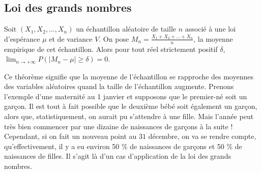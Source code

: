 	\subsection{Loi des grands nombres}

	\begin{formula}
		Soit $(X_1, X_2, \dots, X_n)$ un échantillon aléatoire de taille $n$ associé à une loi d'espérance $\mu$ et de variance $V$. On pose $M_n = \frac{X_1 + X_2 + \dots + X_n}{n}$, la moyenne empirique de cet échantillon.
		\newpar
		Alors pour tout réel strictement positif $\delta$, $\lim_{n \rightarrow +\infty} P(|M_n - \mu| \geq \delta) = 0$.
	\end{formula}

	\begin{tip}
		Ce théorème signifie que la moyenne de l'échantillon se rapproche des moyennes des variables aléatoires quand la taille de l'échantillon augmente.
		\newpar
		Prenons l'exemple d'une maternité au 1\ier{} janvier et supposons que le premier-né soit un garçon. Il est tout à fait possible que le deuxième bébé soit également un garçon, alors que, statistiquement, on aurait pu s'attendre à une fille.
		\newpar
		Mais l'année peut très bien commencer par une dizaine de naissances de garçons à la suite !
		\newpar
		Cependant, si on fait un nouveau point au $31$ décembre, on va se rendre compte, qu'effectivement, il y a eu environ 50 \% de naissances de garçons et 50 \% de naissances de filles. Il s'agit là d'un cas d'application de la loi des grands nombres.
	\end{tip}


